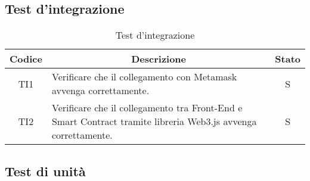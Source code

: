\subsection{Test d'integrazione}\label{subsection:test_integrazione}
\begin{table}[H]
  \centering
  \renewcommand{\arraystretch}{1.8}
  \begin{tabular}{c|p{8cm}|c}
    \rowcolor[HTML]{125E28}
    \color[HTML]{FFFFFF}\textbf{Codice}
        & \multicolumn{1}{c}{\color[HTML]{FFFFFF}\textbf{Descrizione}}
        & \color[HTML]{FFFFFF}\textbf{Stato}                                                                                                   \\
    \hline
    TI1 & Verificare che il collegamento con Metamask\glo{} avvenga correttamente.                                                        & S \\
    TI2 & Verificare che il collegamento tra Front-End\glo{} e Smart Contract\glo{} tramite libreria Web3.js\glo{} avvenga correttamente. & S \\
  \end{tabular}
  \caption{Test d'integrazione}
\end{table}

\vspace{1cm}
\subsection{Test di unità}\label{subsection:test_unita}

